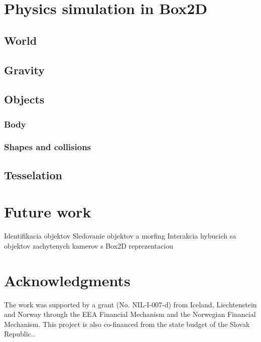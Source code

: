 \documentclass{ifacconf}
\begin{document}
\section{Physics simulation in Box2D}

\subsection{World}
\subsection{Gravity}
\subsection{Objects}
\subsubsection{Body}
\subsubsection{Shapes and collisions}
\subsection{Tesselation}

\section{Future work}
Identifikacia objektov
Sledovanie objektov a morfing
Interakcia hybucich sa objektov zachytenych kamerov s Box2D reprezentaciou

\section*{Acknowledgments}
The work was supported by a grant (No. NIL-I-007-d) from Iceland, Liechtenstein 
and Norway through the EEA Financial Mechanism and the Norwegian Financial 
Mechanism. This project is also co-financed from the state budget of the Slovak Republic..


%
\end{document}
